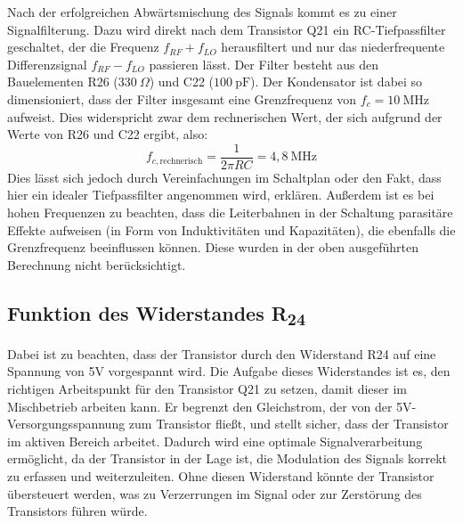 Nach der erfolgreichen Abwärtsmischung des Signals kommt es zu einer Signalfilterung. Dazu wird direkt nach dem Transistor Q21 ein RC-Tiefpassfilter geschaltet, der die Frequenz $f_{RF} + f_{LO}$ herausfiltert und nur das niederfrequente Differenzsignal $f_{RF} - f_{LO}$ passieren lässt. Der Filter besteht aus den Bauelementen R26 ($330~\Omega$) und C22 ($100~\mathrm{pF}$). Der Kondensator ist dabei so dimensioniert, dass der Filter insgesamt eine Grenzfrequenz von $f_{c} = 10~\mathrm{MHz}$ aufweist. Dies widerspricht zwar dem rechnerischen Wert, der sich aufgrund der Werte von R26 und C22 ergibt, also:
\begin{equation}
    f_{c, \text{rechnerisch}} = \frac{1}{2\pi R C} = 4{,}8~\mathrm{MHz}
\end{equation}
Dies lässt sich jedoch durch Vereinfachungen im Schaltplan oder den Fakt, dass hier ein idealer Tiefpassfilter angenommen wird, erklären. Außerdem ist es bei hohen Frequenzen zu beachten, dass die Leiterbahnen in der Schaltung parasitäre Effekte aufweisen (in Form von Induktivitäten und Kapazitäten), die ebenfalls die Grenzfrequenz beeinflussen können. Diese wurden in der oben ausgeführten Berechnung nicht berücksichtigt.

\subsection{Funktion des Widerstandes R\textsubscript{24}}
Dabei ist zu beachten, dass der Transistor durch den Widerstand R24 auf eine Spannung von 5V vorgespannt wird. Die Aufgabe dieses Widerstandes ist es, den richtigen Arbeitspunkt für den Transistor Q21 zu setzen, damit dieser im Mischbetrieb arbeiten kann. Er begrenzt den Gleichstrom, der von der 5V-Versorgungsspannung zum Transistor fließt, und stellt sicher, dass der Transistor im aktiven Bereich arbeitet. Dadurch wird eine optimale Signalverarbeitung ermöglicht, da der Transistor in der Lage ist, die Modulation des Signals korrekt zu erfassen und weiterzuleiten. Ohne diesen Widerstand könnte der Transistor übersteuert werden, was zu Verzerrungen im Signal oder zur Zerstörung des Transistors führen würde.


